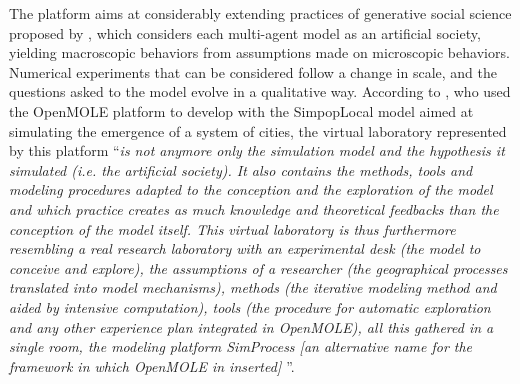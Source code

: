 \documentclass[10pt]{article}
\begin{document}
The platform aims at considerably extending practices of generative social science proposed by \cite{epstein1996growing}, which considers each multi-agent model as an artificial society, yielding macroscopic behaviors from assumptions made on microscopic behaviors. Numerical experiments that can be considered follow a change in scale, and the questions asked to the model evolve in a qualitative way. According to \cite{schmitt2014modelisation}, who used the OpenMOLE platform to develop with \cite{rey2015plateforme} the SimpopLocal model aimed at simulating the emergence of a system of cities, the virtual laboratory represented by this platform ``\textit{is not anymore only the simulation model and the hypothesis it simulated (i.e. the artificial society). It also contains the methods, tools and modeling procedures adapted to the conception and the exploration of the model and which practice creates as much knowledge and theoretical feedbacks than the conception of the model itself. This virtual laboratory is thus furthermore resembling a real research laboratory with an experimental desk (the model to conceive and explore), the assumptions of a researcher (the geographical processes translated into model mechanisms), methods (the iterative modeling method and aided by intensive computation), tools (the procedure for automatic exploration and any other experience plan integrated in OpenMOLE), all this gathered in a single room, the modeling platform SimProcess [an alternative name for the framework in which OpenMOLE in inserted] \citep{rey2015plateforme}}''.
\end{document}
